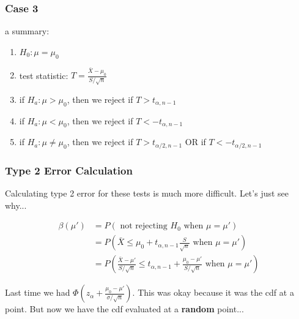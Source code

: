 \documentclass{beamer}
\begin{document}
\begin{frame}
\frametitle{Case 3}

a summary:
\begin{enumerate}
\item $H_0: \mu = \mu_0$
\item test statistic: $T = \frac{\bar{X} - \mu_0}{S/\sqrt{n}}$
\item if $H_a: \mu > \mu_0$, then we reject if $T > t_{\alpha,n-1}$
\item if $H_a: \mu < \mu_0$, then we reject if $T < -t_{\alpha,n-1}$
\item if $H_a: \mu \neq \mu_0$, then we reject if $T > t_{\alpha/2,n-1}$ OR if $T < -t_{\alpha/2,n-1}$
\end{enumerate}


\end{frame}

\begin{frame}
\frametitle{Type 2 Error Calculation}


Calculating type 2 error for these tests is much more difficult. Let's just see why...

\begin{align*}
\beta(\mu') &= P( \text{ not rejecting $H_0$ when } \mu = \mu')\\
&= P(\bar{X} \le \mu_0 + t_{\alpha,n-1}\frac{S}{\sqrt{n}} \text{ when } \mu = \mu') \\
&= P\left( \frac{\bar{X} - \mu'}{S/ \sqrt{n}} \le t_{\alpha,n-1} + \frac{\mu_0 - \mu'}{S / \sqrt{n}} \text{ when } \mu = \mu' \right) 
\end{align*}

Last time we had $\Phi \left( z_{\alpha} + \frac{\mu_0 - \mu'}{\sigma / \sqrt{n}} \right)$. This was okay because it was the cdf at a point. But now we have the cdf evaluated at a \textbf{random} point...

\end{frame}
\end{document}
